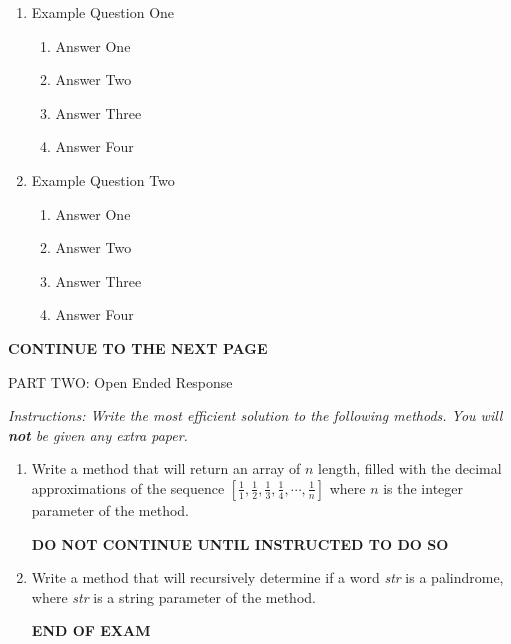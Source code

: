 \documentclass[11pt,fleqn]{article}
\begin{document}
\begin{enumerate}
\item Example Question One
	\begin{enumerate}
	\item Answer One
	\item Answer Two
	\item Answer Three
	\item Answer Four
	\end{enumerate}
\item Example Question Two
	\begin{enumerate}
	\item Answer One
	\item Answer Two
	\item Answer Three
	\item Answer Four
	\end{enumerate}
\end{enumerate}

\vfill
\begin{center}
\textbf{CONTINUE TO THE NEXT PAGE}
\end{center}

\newpage

\begin{center}
\begin{large}
PART TWO: Open Ended Response
\end{large}
\end{center}
\textit{Instructions: Write the most efficient solution to the following methods. You will \textbf{not} be given any extra paper.}

\begin{enumerate}
\item Write a method that will return an array of $n$ length, filled with the decimal approximations of the sequence $\left[ \frac{1}{1}, \frac{1}{2}, \frac{1}{3}, \frac{1}{4}, \cdots, \frac{1}{n} \right]$ where $n$ is the integer parameter of the method.
\vfill
\begin{center}
\textbf{DO NOT CONTINUE UNTIL INSTRUCTED TO DO SO}
\end{center}
\newpage
\item Write a method that will recursively determine if a word \emph{str} is a palindrome, where \emph{str} is a string parameter of the method.
\vfill
\begin{center}
\textbf{END OF EXAM}
\end{center}
\end{enumerate}
\end{document}

